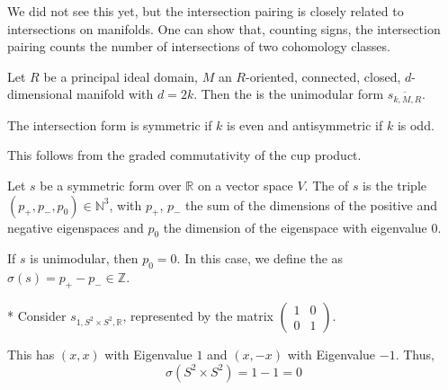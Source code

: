 

\begin{oral}
  We did not see this yet, but the intersection pairing
  is closely related to intersections on manifolds.
  One can show that, counting signs, the intersection pairing
  counts the number of intersections of two
  cohomology classes.
\end{oral}

\begin{definition}
  \label{def:unimodular-form-on-manifold-of-even-dimension}
  Let $R$ be a principal ideal domain,
  $M$ an $R$-oriented, connected, closed,
  $d$-dimensional manifold with $d=2k$.
  Then the  is the unimodular form
  $\overline{s_{k,M,R}}$.
\end{definition}

\begin{remark}
  The intersection form is symmetric if $k$ is even
  and antisymmetric if $k$ is odd.

  This follows from the graded commutativity of the cup product.
\end{remark}


\begin{definition}
  \label{def:signature-of-form}
  Let $s$ be a symmetric form over $\mathbb{R}$
  on a vector space $V$.
  The  of $s$ is the triple
  $(p_{+}, p_{-}, p_0) \in \mathbb{N}^3$,
  with $p_{+}$, $p_{-}$ the sum of the dimensions of the
  positive and negative eigenspaces and $p_0$ the dimension
  of the eigenspace with eigenvalue $0$.

  If $s$ is unimodular, then $p_0=0$.
  In this case, we define the   as
  $σ(s) = p_{+} - p_{-} \in \mathbb{Z}$.
\end{definition}

\begin{example}*
  Consider $s_{1, S^2 \times S^2, \mathbb{R}}$,
  represented by the matrix
  $\begin{pmatrix} 1 & 0 \\ 0 & 1 \end{pmatrix} $.

  This has $(x,x)$ with Eigenvalue $1$
  and $(x,-x)$ with Eigenvalue $-1$.
  Thus,
  \[
    σ(S^2\times S^2) = 1 - 1 = 0
  \] 
\end{example}

